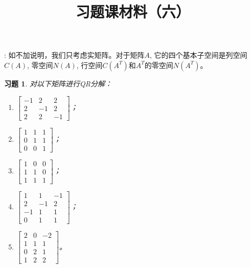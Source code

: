\documentclass[UTF8]{ctexart}
\newtheorem{ex}[thm]{习题}
\begin{document}
\title{习题课材料（六）}

\date{}

\maketitle

\vspace{-1cm}



\medskip

: 如不加说明，我们只考虑实矩阵。对于矩阵$A$, 它的四个基本子空间是列空间$C(A)$, 零空间$N(A)$, 行空间$C(A^T)$和$A^T$的零空间$N(A^T)$。

\medskip



\begin{ex}
对以下矩阵进行QR分解：
\begin{enumerate}
\item $\begin{bmatrix}-1&2&2\\2&-1&2\\2&2&-1\end{bmatrix}$；
\item $\begin{bmatrix}1&1&1\\0&1&1\\0&0&1\end{bmatrix}$；
\item $\begin{bmatrix}1&0&0\\1&1&0\\1&1&1\end{bmatrix}$；
\item $\begin{bmatrix}1&1&-1\\2&-1&2\\-1&1&1\\0&1&1\end{bmatrix}$；
\item $\begin{bmatrix}2&0&-2\\1&1&1\\0&2&1\\1&2&2\end{bmatrix}$。
\end{enumerate}
\end{ex}
\end{document}
